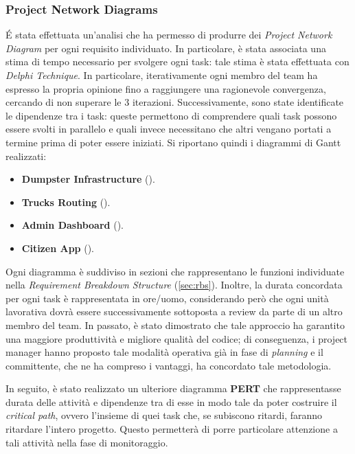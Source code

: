 \subsubsection{Project Network Diagrams}
\'E stata effettuata un'analisi che ha permesso di produrre dei \textit{Project Network Diagram} per ogni requisito individuato.
In particolare, è stata associata una stima di tempo necessario per svolgere ogni task: tale stima è stata effettuata con \textit{Delphi Technique}.
In particolare, iterativamente ogni membro del team ha espresso la propria opinione fino a raggiungere una ragionevole convergenza, cercando di non superare le 3 iterazioni.
Successivamente, sono state identificate le dipendenze tra i task: queste permettono di comprendere quali task possono essere svolti in parallelo e quali invece necessitano che altri vengano portati a termine prima di poter essere iniziati.
Si riportano quindi i diagrammi di Gantt realizzati:
\begin{itemize}
    \item \textbf{Dumpster Infrastructure} ().
    \item \textbf{Trucks Routing} ().
    \item \textbf{Admin Dashboard} ().
    \item \textbf{Citizen App} ().
\end{itemize}
Ogni diagramma è suddiviso in sezioni che rappresentano le funzioni individuate nella \textit{Requirement Breakdown Structure} (\ref{sec:rbs}).
Inoltre, la durata concordata per ogni task è rappresentata in ore/uomo, considerando però che ogni unità lavorativa dovrà essere successivamente sottoposta a review da parte di un altro membro del team.
In passato, è stato dimostrato che tale approccio ha garantito una maggiore produttività e migliore qualità del codice; di conseguenza, i project manager hanno proposto tale modalità operativa già in fase di \textit{planning} e il committente, che ne ha compreso i vantaggi, ha concordato tale metodologia.

In seguito, è stato realizzato un ulteriore diagramma \textbf{PERT}  che rappresentasse durata delle attività e dipendenze tra di esse in modo tale da poter costruire il \textit{critical path}, ovvero l'insieme di quei task che, se subiscono ritardi, faranno ritardare l'intero progetto. Questo permetterà di porre particolare attenzione a tali attività nella fase di monitoraggio.

